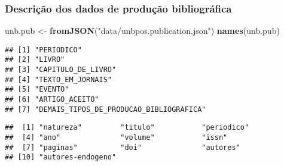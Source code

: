 \documentclass[]{article}
\newenvironment{Shaded}{\begin{snugshade}}{\end{snugshade}}
\newcommand{\KeywordTok}[1]{\textcolor[rgb]{0.13,0.29,0.53}{\textbf{#1}}}
\newcommand{\DataTypeTok}[1]{\textcolor[rgb]{0.13,0.29,0.53}{#1}}
\newcommand{\DecValTok}[1]{\textcolor[rgb]{0.00,0.00,0.81}{#1}}
\newcommand{\StringTok}[1]{\textcolor[rgb]{0.31,0.60,0.02}{#1}}
\newcommand{\OtherTok}[1]{\textcolor[rgb]{0.56,0.35,0.01}{#1}}
\newcommand{\OperatorTok}[1]{\textcolor[rgb]{0.81,0.36,0.00}{\textbf{#1}}}
\newcommand{\NormalTok}[1]{#1}
\begin{document}
\subsubsection{Descrição dos dados de produção
bibliográfica}\label{descricao-dos-dados-de-producao-bibliografica}

\begin{Shaded}
\begin{Highlighting}[]
\NormalTok{unb.pub <-}\StringTok{ }\KeywordTok{fromJSON}\NormalTok{(}\StringTok{"data/unbpos.publication.json"}\NormalTok{)}
\KeywordTok{names}\NormalTok{(unb.pub)}
\end{Highlighting}
\end{Shaded}

\begin{verbatim}
## [1] "PERIODICO"                             
## [2] "LIVRO"                                 
## [3] "CAPITULO_DE_LIVRO"                     
## [4] "TEXTO_EM_JORNAIS"                      
## [5] "EVENTO"                                
## [6] "ARTIGO_ACEITO"                         
## [7] "DEMAIS_TIPOS_DE_PRODUCAO_BIBLIOGRAFICA"
\end{verbatim}

\begin{Shaded}
\end{Shaded}

\begin{verbatim}
##  [1] "natureza"         "titulo"           "periodico"       
##  [4] "ano"              "volume"           "issn"            
##  [7] "paginas"          "doi"              "autores"         
## [10] "autores-endogeno"
\end{verbatim}

\begin{Shaded}
\end{Shaded}
\end{document}
